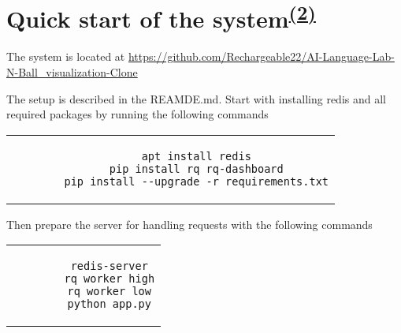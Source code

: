\appendix
\chapter{Quick start of the system\textsuperscript{\hyperref[Oliver]{(2)}}}

The system is located at
\url{https://github.com/Rechargeable22/AI-Language-Lab-N-Ball_visualization-Clone}

The setup is described in the REAMDE.md.
Start with installing redis and all required packages by running the following commands

\begin{center}
	\begin{tabular}{c}
		\begin{lstlisting}
		apt install redis
		pip install rq rq-dashboard
		pip install --upgrade -r requirements.txt
		\end{lstlisting}
	\end{tabular}
\end{center}

Then prepare the server for handling requests with the following commands

\begin{center}
	\begin{tabular}{c}
		\begin{lstlisting}
		redis-server
		rq worker high
		rq worker low
		python app.py
		\end{lstlisting}
	\end{tabular}
\end{center}